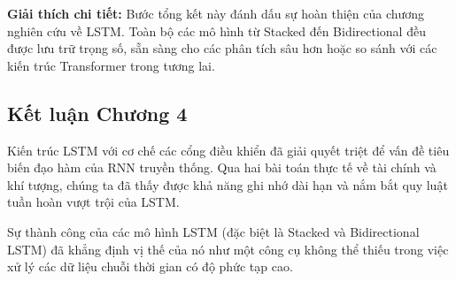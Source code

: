 \textbf{Giải thích chi tiết:} Bước tổng kết này đánh dấu sự hoàn thiện của chương nghiên cứu về LSTM. Toàn bộ các mô hình từ Stacked đến Bidirectional đều được lưu trữ trọng số, sẵn sàng cho các phân tích sâu hơn hoặc so sánh với các kiến trúc Transformer trong tương lai.

\subsection{Kết luận Chương 4}
Kiến trúc LSTM với cơ chế các cổng điều khiển đã giải quyết triệt để vấn đề tiêu biến đạo hàm của RNN truyền thống. Qua hai bài toán thực tế về tài chính và khí tượng, chúng ta đã thấy được khả năng ghi nhớ dài hạn và nắm bắt quy luật tuần hoàn vượt trội của LSTM.

Sự thành công của các mô hình LSTM (đặc biệt là Stacked và Bidirectional LSTM) đã khẳng định vị thế của nó như một công cụ không thể thiếu trong việc xử lý các dữ liệu chuỗi thời gian có độ phức tạp cao.
